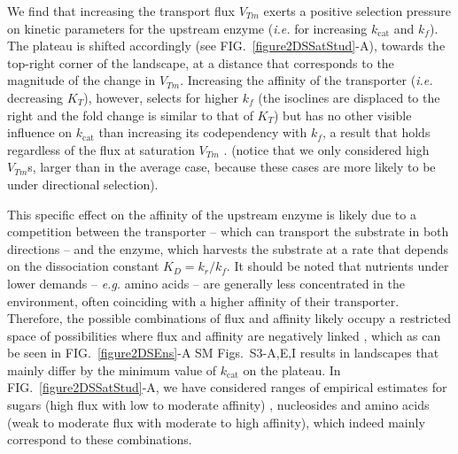 \documentclass[11pt,onecolumn]{article}
\providecommand{\DIFadd}[1]{{\protect\color{blue} \sf #1}} %
\providecommand{\DIFdel}[1]{{\protect\color{red} \scriptsize #1}} %
\providecommand{\DIFaddbegin}{} %
\providecommand{\DIFaddend}{} %
\providecommand{\DIFdelbegin}{} %
\providecommand{\DIFdelend}{} %
\begin{document}
\DIFdel{We }\DIFdelend find that increasing the transport flux $V_{Tm}$ exerts a positive selection pressure on kinetic parameters for the upstream enzyme (\textit{i.e.} for increasing $k_\text{cat}$ and $k_f$). The plateau is shifted accordingly \DIFaddbegin \DIFadd{(see FIG.~\ref{figure2DSSatStud}-A)}\DIFaddend , towards the top-right corner of the landscape, at a distance that corresponds to the magnitude of the change in $V_{Tm}$. Increasing the affinity of the transporter (\textit{i.e.} decreasing $K_T$), however, selects for higher $k_{f}$ (the isoclines are displaced to the right and the fold change is similar to that of $K_T$) but has no \DIFaddbegin \DIFadd{other }\DIFaddend visible influence on $k_\text{cat}$ \DIFaddbegin \DIFadd{than increasing its codependency with $k_f$}\DIFaddend , a result that holds regardless of the flux at saturation $V_{Tm}$ \DIFdelbegin \DIFdel{. 
}\DIFdelend \DIFaddbegin \DIFadd{(notice that we only considered high $V_{Tm}$s, larger than in the average case, because these cases are more likely to be under directional selection). 
}

\DIFaddend This specific effect on the affinity of the upstream enzyme is likely due to a competition between the transporter -- which can transport the substrate in both directions -- and the enzyme, which harvests the substrate at a rate that depends on the dissociation constant $K_D=k_r/k_f$. It should be noted that nutrients under lower demands -- \textit{e.g.} amino acids -- are generally less concentrated in the environment, often coinciding with a higher affinity of their transporter. Therefore, the possible combinations of flux and affinity likely occupy a restricted space of possibilities where flux and affinity are negatively linked \DIFaddbegin \DIFadd{\citep{Gudelj10,Bosdriesz18}}\DIFaddend , which as can be seen in \DIFdelbegin \DIFdel{FIG.~\ref{figure2DSEns}-A}\DIFdelend \DIFaddbegin \DIFadd{SM Figs.~S3-A}\DIFaddend ,E,I results in landscapes that mainly differ by the minimum value of $k_\text{cat}$ on the plateau. \DIFaddbegin \DIFadd{In FIG.~\ref{figure2DSSatStud}-A, we have considered ranges of empirical estimates for sugars (high flux with low to moderate affinity) \citep{Stein86d,Maier02}, nucleosides \citep{Griffith96} and amino acids \citep{Stein86d,Zampieri2019} (weak to moderate flux with moderate to high affinity), which indeed mainly correspond to these combinations.   
}\DIFaddend 
\end{document}
